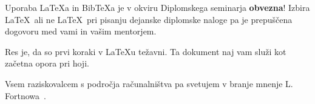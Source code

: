 \documentclass[a4paper, 12pt]{book}
\newcommand{\BibTeX}{{\sc Bib}\TeX}
\begin{document}
Uporaba \LaTeX{a} in \BibTeX{a} je v okviru Diplomskega seminarja \textbf{obvezna}!
Izbira \LaTeX\ ali ne \LaTeX\ pri pisanju dejanske diplomske naloge pa je pre\-pu\-šče\-na dogovoru med vami in vašim mentorjem.

Res je, da so prvi koraki v \LaTeX{}u težavni. 
Ta dokument naj vam služi kot začetna opora pri hoji.

Vsem raziskovalcem s področja računalništva pa svetujem v branje mnenje L. Fortnowa~\cite{fortnow2009viewpoint}.

\newpage
\ \\
\clearpage
{}


\end{document}
